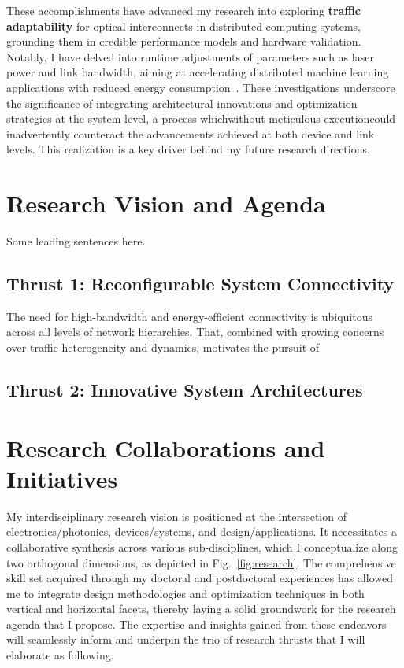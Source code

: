 These accomplishments have advanced my research into exploring \textbf{traffic adaptability} for optical interconnects in distributed computing systems, grounding them in credible performance models and hardware validation. Notably, I have delved into runtime adjustments of parameters such as laser power and link bandwidth, aiming at accelerating distributed machine learning applications with reduced energy consumption~\cite{wangTaskMappingAssistedLaser2019,wangTrafficAdaptivePowerReconfiguration2021,brianJOCN}. These investigations underscore the significance of integrating architectural innovations and optimization strategies at the system level, a process which\textemdash without meticulous execution\textemdash could inadvertently counteract the advancements achieved at both device and link levels. This realization is a key driver behind my future research directions.

\section{Research Vision and Agenda}
Some leading sentences here.
\subsection{Thrust 1: Reconfigurable System Connectivity}
The need for high-bandwidth and energy-efficient connectivity is ubiquitous across all levels of network hierarchies. That, combined with growing concerns over traffic heterogeneity and dynamics, motivates the pursuit of

\subsection{Thrust 2: Innovative System Architectures}


\section{Research Collaborations and Initiatives}


My interdisciplinary research vision is positioned at the intersection of electronics/photonics, devices/systems, and design/applications. It necessitates a collaborative synthesis across various sub-disciplines, which I conceptualize along two orthogonal dimensions, as depicted in Fig.~\ref{fig:research}. The comprehensive skill set acquired through my doctoral and postdoctoral experiences has allowed me to integrate design methodologies and optimization techniques in both vertical and horizontal facets, thereby laying a solid groundwork for the research agenda that I propose. The expertise and insights gained from these endeavors will seamlessly inform and underpin the trio of research thrusts that I will elaborate as following.

